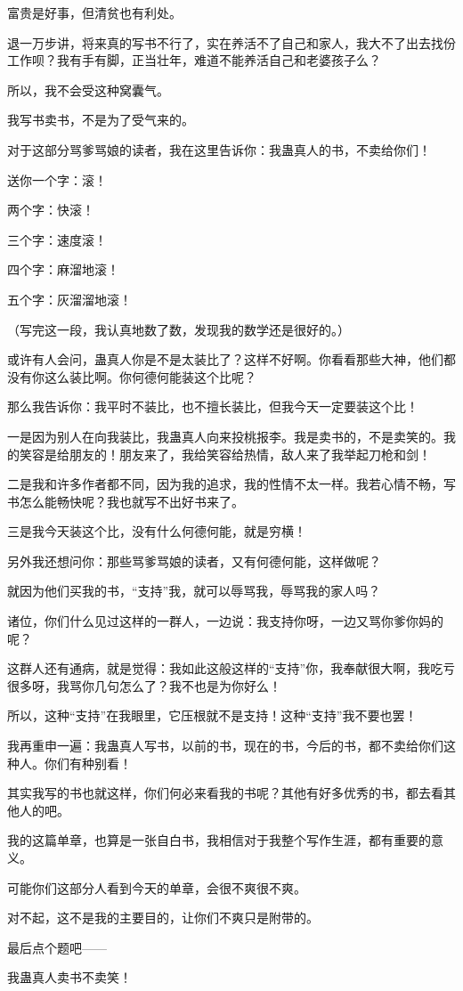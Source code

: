 \begin{this_body}
富贵是好事，但清贫也有利处。

退一万步讲，将来真的写书不行了，实在养活不了自己和家人，我大不了出去找份工作呗？我有手有脚，正当壮年，难道不能养活自己和老婆孩子么？

所以，我不会受这种窝囊气。

我写书卖书，不是为了受气来的。

对于这部分骂爹骂娘的读者，我在这里告诉你：我蛊真人的书，不卖给你们！

送你一个字：滚！

两个字：快滚！

三个字：速度滚！

四个字：麻溜地滚！

五个字：灰溜溜地滚！

（写完这一段，我认真地数了数，发现我的数学还是很好的。）

或许有人会问，蛊真人你是不是太装比了？这样不好啊。你看看那些大神，他们都没有你这么装比啊。你何德何能装这个比呢？

那么我告诉你：我平时不装比，也不擅长装比，但我今天一定要装这个比！

一是因为别人在向我装比，我蛊真人向来投桃报李。我是卖书的，不是卖笑的。我的笑容是给朋友的！朋友来了，我给笑容给热情，敌人来了我举起刀枪和剑！

二是我和许多作者都不同，因为我的追求，我的性情不太一样。我若心情不畅，写书怎么能畅快呢？我也就写不出好书来了。

三是我今天装这个比，没有什么何德何能，就是穷横！

另外我还想问你：那些骂爹骂娘的读者，又有何德何能，这样做呢？

就因为他们买我的书，“支持”我，就可以辱骂我，辱骂我的家人吗？

诸位，你们什么见过这样的一群人，一边说：我支持你呀，一边又骂你爹你妈的呢？

这群人还有通病，就是觉得：我如此这般这样的“支持”你，我奉献很大啊，我吃亏很多呀，我骂你几句怎么了？我不也是为你好么！

所以，这种“支持”在我眼里，它压根就不是支持！这种“支持”我不要也罢！

我再重申一遍：我蛊真人写书，以前的书，现在的书，今后的书，都不卖给你们这种人。你们有种别看！

其实我写的书也就这样，你们何必来看我的书呢？其他有好多优秀的书，都去看其他人的吧。

我的这篇单章，也算是一张自白书，我相信对于我整个写作生涯，都有重要的意义。

可能你们这部分人看到今天的单章，会很不爽很不爽。

对不起，这不是我的主要目的，让你们不爽只是附带的。

最后点个题吧——

我蛊真人卖书不卖笑！

\end{this_body}

